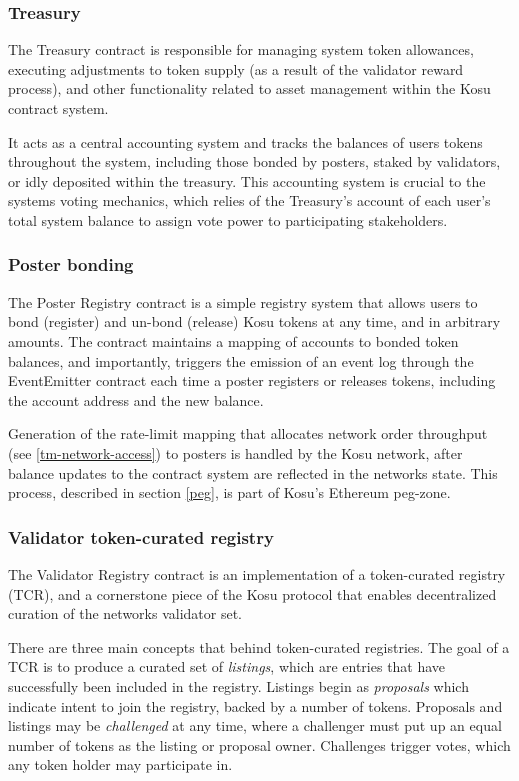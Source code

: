 \documentclass[10pt]{article}
\begin{document}
\subsubsection{Treasury}\label{ethereum-contract-system-treasury}
The Treasury contract is responsible for managing system token allowances, executing adjustments to token supply (as a result of the validator reward process), and other functionality related to asset management within the Kosu contract system.
\medskip

It acts as a central accounting system and tracks the balances of users tokens throughout the system, including those bonded by posters, staked by validators, or idly deposited within the treasury. This accounting system is crucial to the systems voting mechanics, which relies of the Treasury’s account of each user’s total system balance to assign vote power to participating stakeholders. 
\subsubsection{Poster bonding}\label{ethereum-contract-system-poster-bonding}
The Poster Registry contract is a simple registry system that allows users to bond (register) and un-bond (release) Kosu tokens at any time, and in arbitrary amounts. The contract maintains a mapping of accounts to bonded token balances, and importantly, triggers the emission of an event log through the EventEmitter contract each time a poster registers or releases tokens, including the account address and the new balance.
\medskip

Generation of the rate-limit mapping that allocates network order throughput (see \ref{tm-network-access}) to posters is handled by the Kosu network, after balance updates to the contract system are reflected in the networks state. This process, described in section \ref{peg}, is part of Kosu’s Ethereum peg-zone.
\subsubsection{Validator token-curated registry}\label{ethereum-contract-system-tcr}
The Validator Registry contract is an implementation of a token-curated registry (TCR), and a cornerstone piece of the Kosu protocol that enables decentralized curation of the networks validator set.

There are three main concepts that behind token-curated registries. The goal of a TCR is to produce a curated set of \textit{listings}, which are entries that have successfully been included in the registry. Listings begin as \textit{proposals} which indicate intent to join the registry, backed by a number of tokens. Proposals and listings may be \textit{challenged} at any time, where a challenger must put up an equal number of tokens as the listing or proposal owner. Challenges trigger votes, which any token holder may participate in. 
\medskip
\end{document}

